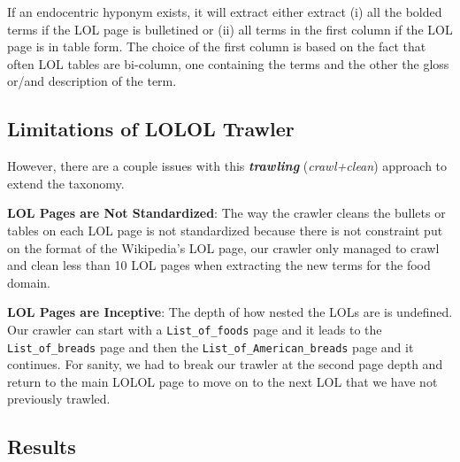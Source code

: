 If an endocentric hyponym exists, it will extract either extract (i) all the bolded terms if the LOL page is bulletined or (ii) all terms in the first column if the LOL page is in table form. The choice of the first column is based on the fact that often LOL tables are bi-column, one containing the terms and the other the gloss or/and description of the term.

\subsection{Limitations of LOLOL Trawler}

However, there are a couple issues with this \emph{\textbf{trawling}} (\emph{crawl+clean}) approach to extend the taxonomy.

\textbf{LOL Pages are Not Standardized}: The way the crawler cleans the bullets or tables on each LOL page is not standardized because there is not constraint put on the format of the Wikipedia's LOL page, our crawler only managed to crawl and clean less than 10 LOL pages when extracting the new terms for the food domain. 

\textbf{LOL Pages are Inceptive}: The depth of how nested the LOLs are is undefined. Our crawler can start with a {\tt List\_of\_foods} page and it leads to the {\tt List\_of\_breads} page and then the {\tt List\_of\_American\_breads} page and it continues. For sanity, we had to break our trawler at the second page depth and return to the main LOLOL page to move on to the next LOL that we have not previously trawled. 

\subsection{Results}

